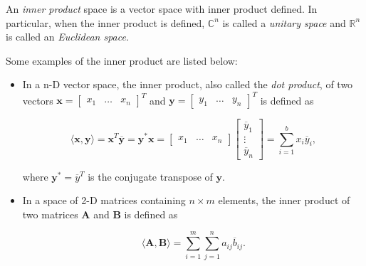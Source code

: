 \documentclass[10pt,b5paper,titlepage]{book}
\begin{document}
\begin{itemize}
\begin{itemize}
                 An \textit{inner product} space is a vector space with inner
                 product defined. In particular, when the inner product is defined,
                 $\mathbb{C}^{n}$ is called a \textit{unitary space} and $\mathbb{R}^{n}$
                 is called an \textit{Euclidean space}.

                 Some examples of the inner product are listed below:

                 \begin{itemize}
                     \item In a n-D vector space, the inner product, also called
                         the \textit{dot product}, of two vectors
                         $\mathbf{x} = \begin{bmatrix} x_1 & \ldots & x_n \end{bmatrix}^{T}$
                         and $\mathbf{y} = \begin{bmatrix} y_1 & \ldots & y_n \end{bmatrix}^{T}$
                         is defined as

                         \begin{equation}
                             \langle \mathbf{x}, \mathbf{y} \rangle
                             = \mathbf{x}^{T} \overline{\mathbf{y}}
                             = \mathbf{y}^{*} \mathbf{x}
                             = \begin{bmatrix} x_1 & \ldots & x_n \end{bmatrix}
                             \begin{bmatrix} \overline{y}_1\\ \vdots\\ \overline{y}_n \end{bmatrix}
                             = \sum_{i=1}^{b} x_{i} \overline{y}_{i}
                         ,\end{equation}

                         where $\mathbf{y}^{*} = \overline{y}^{T}$ is the conjugate transpose
                         of $\mathbf{y}$.

                     \item In a space of 2-D matrices containing $n \times m$ elements,
                         the inner product of two matrices $\mathbf{A}$
                         and $\mathbf{B}$ is defined as

                         \begin{equation}
                             \langle \mathbf{A}, \mathbf{B} \rangle
                             = \sum_{i=1}^{m} \sum_{j=1}^{n} a_{ij} \overline{b}_{ij}
                         .\end{equation}


\end{itemize}
\end{itemize}
\end{itemize}
\end{document}
